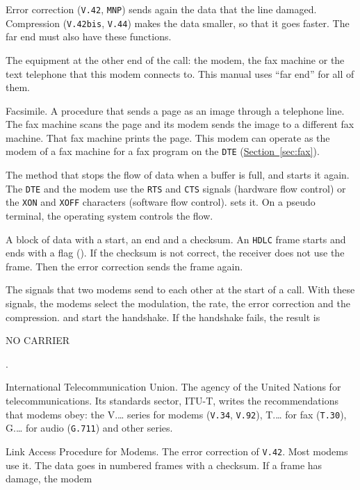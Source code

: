 \documentclass[a5paper,10pt]{article}
\makeatletter
\newcommand{\cmd}[1]{\texttt{#1}}
\DeclareRobustCommand{\rc}[1]{{\setlength{\fboxsep}{1pt}%
  \colorbox{dmrc}{\ttfamily\color{dmnavy}\rule[-0.45ex]{0pt}{1.95ex}#1}}}
\newcommand{\std}[1]{\texttt{#1}}
\newcommand{\stdb}[1]{\textpdfrender{TextRenderingMode=FillStroke,
  LineWidth=0.25pt}{\texttt{#1}}}
\newcommand{\cmdl}[2][]{\hyperlink{cmd:#1}{\cmd{#2}}}
\let\cmd\@firstofone
\makeatother
\begin{document}
\begin{description}[style=nextline,leftmargin=1.2em,font=\bfseries\color{dmnavy}]
\item[Error correction and compression] Error correction (\std{V.42},
  \std{MNP}) sends again the data that the line damaged.  Compression
  (\std{V.42bis}, \std{V.44}) makes the data smaller, so that it goes
  faster.  The far end must also have these functions.
\item[Far end] The equipment at the other end of the call: the modem,
  the fax machine or the text telephone that this modem connects to.
  This manual uses ``far end'' for all of them.
\item[Fax] Facsimile.  A procedure that sends a page as an image through
  a telephone line.  The fax machine scans the page and its modem sends
  the image to a different fax machine.  That fax machine prints the
  page.  This modem can operate as the modem of a fax machine for a fax
  program on the \std{DTE} (\hyperref[sec:fax]{Section~\ref*{sec:fax}}).
\item[Flow control] The method that stops the flow of data when a buffer
  is full, and starts it again.  The \std{DTE} and the modem use the
  \std{RTS} and \std{CTS} signals (hardware flow control) or the
  \std{XON} and \std{XOFF} characters (software flow control).
  \cmdl[plusIFC]{+IFC} sets it.  On a pseudo terminal, the operating
  system controls the flow.
\item[Frame] A block of data with a start, an end and a checksum.  An
  \std{HDLC} frame starts and ends with a flag (\cmd{01111110}).  If the
  checksum is not correct, the receiver does not use the frame.  Then
  the error correction sends the frame again.
\item[Handshake] The signals that two modems send to each other at the
  start of a call.  With these signals, the modems select the
  modulation, the rate, the error correction and the compression.
  \cmdl[D]{ATD} and \cmdl[A]{ATA} start the handshake.  If the handshake
  fails, the result is \rc{NO CARRIER}.
\item[\stdb{ITU}] International Telecommunication Union.  The agency of
  the United Nations for telecommunications.  Its standards sector,
  ITU-T, writes the recommendations that modems obey: the V.\ldots{}
  series for modems (\std{V.34}, \std{V.92}), T.\ldots{} for fax
  (\std{T.30}), G.\ldots{} for audio (\std{G.711}) and other series.
\item[\stdb{LAPM}] Link Access Procedure for Modems.  The error
  correction of \std{V.42}.  Most modems use it.  The data goes in
  numbered frames with a checksum.  If a frame has damage, the modem

\end{description}
\end{document}
